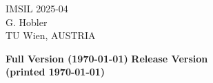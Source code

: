 %
\begin{center}
{
\vspace*{4cm}
%
\titlefont
IMSIL 2025-04 \\ \vspace*{3cm}
%
\authorfont
G. Hobler \\ \vspace*{1ex}
}
\vspace*{2.5cm}
%
TU Wien, AUSTRIA \\ \vspace*{1ex}

%
\ifprivate
   {\bf Full Version (\today)}
\else
   {\bf Release Version \\ (printed \today)}
\fi
%
\end{center}
